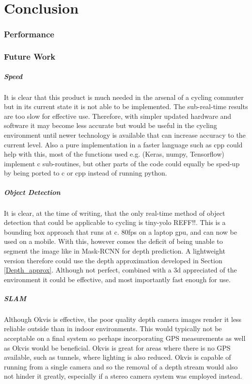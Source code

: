 \documentclass[11pt,twoside]{report}
\begin{document}
\chapter{Conclusion}

\subsection{Performance}

\subsection{Future Work}

\paragraph{Speed} It is clear that this product is much needed in the arsenal of a cycling commuter but in its current state it is not able to be implemented. The sub-real-time results are too slow for effective use. Therefore, with simpler updated hardware and software it may become less accurate but would be useful in the cycling environment until newer technology is available that can increase accuracy to the current level. Also a pure implementation in a faster language such as cpp could help with this, most of the functions used e.g. (Keras, numpy, Tensorflow) implement c sub-routines, but other parts of the code could equally be sped-up by being ported to c or cpp instead of running python.

\paragraph{Object Detection} It is clear, at the time of writing, that the only real-time method of object detection that could be applicable to cycling is tiny-yolo REFF!!. This is a bounding box approach that runs at c. 80fps on a laptop gpu, and can now be used on a mobile. With this, however comes the deficit of being unable to segment the image like in Mask-RCNN for depth prediction. A lightweight version therefore could use the depth approximation developed in Section \ref{Depth_approx}. Although not perfect, combined with a 3d appreciated of the environment it could be effective, and most importantly fast enough for use. 

\paragraph{SLAM} Although Okvis is effective, the poor quality depth camera images render it less reliable outside than in indoor environments. This would typically not be acceptable on a final system so perhaps incorporating GPS measurements as well as Okvis would be beneficial. Okvis is great for areas where there is no GPS available, such as tunnels, where lighting is also reduced. Okvis is capable of running from a single camera and so the removal of a depth stream would also not hinder it greatly, especially if a stereo camera system was employed instead.
\end{document}

